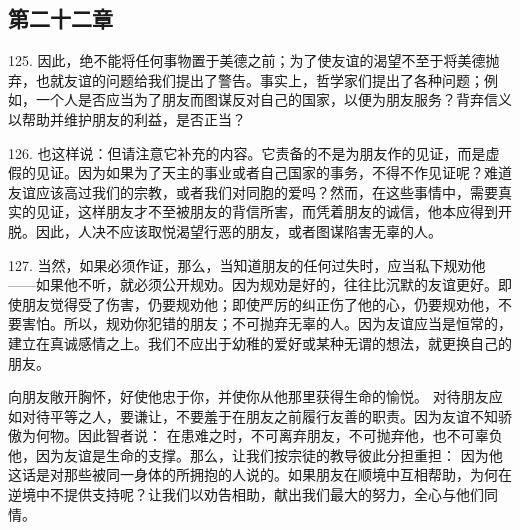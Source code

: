 \subsection{第二十二章}

\par

125. 因此，绝不能将任何事物置于美德之前；为了使友谊的渴望不至于将美德抛弃，也就友谊的问题给我们提出了警告。事实上，哲学家们提出了各种问题；例如，一个人是否应当为了朋友而图谋反对自己的国家，以便为朋友服务？背弃信义以帮助并维护朋友的利益，是否正当？\par

126. 也这样说：但请注意它补充的内容。它责备的不是为朋友作的见证，而是虚假的见证。因为如果为了天主的事业或者自己国家的事务，不得不作见证呢？难道友谊应该高过我们的宗教，或者我们对同胞的爱吗？然而，在这些事情中，需要真实的见证，这样朋友才不至被朋友的背信所害，而凭着朋友的诚信，他本应得到开脱。因此，人决不应该取悦渴望行恶的朋友，或者图谋陷害无辜的人。\par

127. 当然，如果必须作证，那么，当知道朋友的任何过失时，应当私下规劝他——如果他不听，就必须公开规劝。因为规劝是好的，往往比沉默的友谊更好。即使朋友觉得受了伤害，仍要规劝他；即使严厉的纠正伤了他的心，仍要规劝他，不要害怕。所以，规劝你犯错的朋友；不可抛弃无辜的人。因为友谊应当是恒常的，建立在真诚感情之上。我们不应出于幼稚的爱好或某种无谓的想法，就更换自己的朋友。\par

向朋友敞开胸怀，好使他忠于你，并使你从他那里获得生命的愉悦。 对待朋友应如对待平等之人，要谦让，不要羞于在朋友之前履行友善的职责。因为友谊不知骄傲为何物。因此智者说： 在患难之时，不可离弃朋友，不可抛弃他，也不可辜负他，因为友谊是生命的支撑。那么，让我们按宗徒的教导彼此分担重担： 因为他这话是对那些被同一身体的所拥抱的人说的。如果朋友在顺境中互相帮助，为何在逆境中不提供支持呢？让我们以劝告相助，献出我们最大的努力，全心与他们同情。\par

